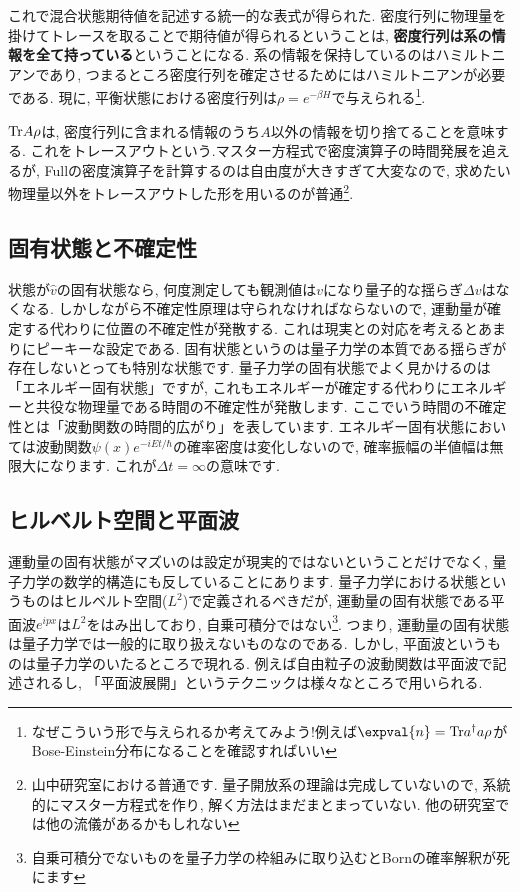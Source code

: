 \documentclass[10.5pt,a4paper]{jreport}
\begin{document}
これで混合状態期待値を記述する統一的な表式が得られた. 密度行列に物理量を掛けてトレースを取ることで期待値が得られるということは, {\bf 密度行列は系の情報を全て持っている}ということになる. 系の情報を保持しているのはハミルトニアンであり, つまるところ密度行列を確定させるためにはハミルトニアンが必要である. 現に, 平衡状態における密度行列は$\rho = e^{-\beta H}$で与えられる\footnote{なぜこういう形で与えられるか考えてみよう!例えば$\expval{n} = {\rm Tr}a^\dagger a\rho$がBose-Einstein分布になることを確認すればいい}.

${\rm Tr}A\rho$は, 密度行列に含まれる情報のうち$A$以外の情報を切り捨てることを意味する. これをトレースアウトという.マスター方程式で密度演算子の時間発展を追えるが, Fullの密度演算子を計算するのは自由度が大きすぎて大変なので, 求めたい物理量以外をトレースアウトした形を用いるのが普通\footnote{山中研究室における普通です. 量子開放系の理論は完成していないので, 系統的にマスター方程式を作り, 解く方法はまだまとまっていない. 他の研究室では他の流儀があるかもしれない}.
\subsection{固有状態と不確定性}
状態が$\hat{v}$の固有状態なら, 何度測定しても観測値は$v$になり量子的な揺らぎ$\Delta v$はなくなる. しかしながら不確定性原理は守られなければならないので, 運動量が確定する代わりに位置の不確定性が発散する. これは現実との対応を考えるとあまりにピーキーな設定である. 固有状態というのは量子力学の本質である揺らぎが存在しないとっても特別な状態です. 量子力学の固有状態でよく見かけるのは「エネルギー固有状態」ですが, これもエネルギーが確定する代わりにエネルギーと共役な物理量である時間の不確定性が発散します. ここでいう時間の不確定性とは「波動関数の時間的広がり」を表しています. エネルギー固有状態においては波動関数$\psi(x) e^{-iEt/\hbar}$の確率密度は変化しないので, 確率振幅の半値幅は無限大になります. これが$\Delta t = \infty$の意味です.
\subsection{ヒルベルト空間と平面波}
運動量の固有状態がマズいのは設定が現実的ではないということだけでなく, 量子力学の数学的構造にも反していることにあります. 量子力学における状態というものはヒルベルト空間($L^2$)で定義されるべきだが, 運動量の固有状態である平面波$e^{ipx}$は$L^2$をはみ出しており, 自乗可積分ではない\footnote{自乗可積分でないものを量子力学の枠組みに取り込むとBornの確率解釈が死にます}. つまり, 運動量の固有状態は量子力学では一般的に取り扱えないものなのである. しかし, 平面波というものは量子力学のいたるところで現れる. 例えば自由粒子の波動関数は平面波で記述されるし, 「平面波展開」というテクニックは様々なところで用いられる.
\end{document}
